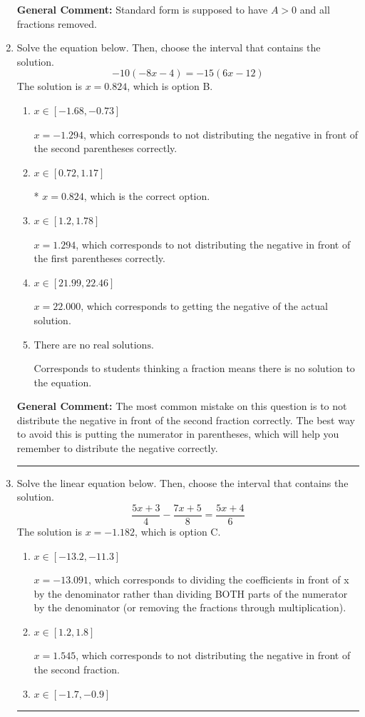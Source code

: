 \documentclass{extbook}[14pt]
\newcommand{\litem}[1]{\item #1

\rule{\textwidth}{0.4pt}}
\begin{document}
\begin{enumerate}
{\textbf{General Comment:} Standard form is supposed to have $A > 0$ and all fractions removed.
}
\litem{
Solve the equation below. Then, choose the interval that contains the solution.
\[ -10(-8x -4) = -15(6x -12) \]The solution is \( x = 0.824 \), which is option B.\begin{enumerate}[label=\Alph*.]
\item \( x \in [-1.68, -0.73] \)

$x = -1.294$, which corresponds to not distributing the negative in front of the second parentheses correctly.
\item \( x \in [0.72, 1.17] \)

* $x = 0.824$, which is the correct option.
\item \( x \in [1.2, 1.78] \)

$x = 1.294$, which corresponds to not distributing the negative in front of the first parentheses correctly.
\item \( x \in [21.99, 22.46] \)

$x = 22.000$, which corresponds to getting the negative of the actual solution.
\item \( \text{There are no real solutions.} \)

Corresponds to students thinking a fraction means there is no solution to the equation.
\end{enumerate}

\textbf{General Comment:} The most common mistake on this question is to not distribute the negative in front of the second fraction correctly. The best way to avoid this is putting the numerator in parentheses, which will help you remember to distribute the negative correctly.
}
\litem{
Solve the linear equation below. Then, choose the interval that contains the solution.
\[ \frac{5x + 3}{4} - \frac{7x + 5}{8} = \frac{5x + 4}{6} \]The solution is \( x = -1.182 \), which is option C.\begin{enumerate}[label=\Alph*.]
\item \( x \in [-13.2, -11.3] \)

 $x = -13.091$, which corresponds to dividing the coefficients in front of x by the denominator rather than dividing BOTH parts of the numerator by the denominator (or removing the fractions through multiplication).
\item \( x \in [1.2, 1.8] \)

 $x = 1.545$, which corresponds to not distributing the negative in front of the second fraction.
\item \( x \in [-1.7, -0.9] \)


\end{enumerate}}
\end{enumerate}
\end{document}
